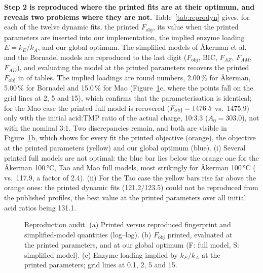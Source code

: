 \textbf{Step 2 is reproduced where the printed fits are at their optimum, and reveals two problems where they are not.} Table~\ref{tab:reprodyn} gives, for each of the twelve dynamic fits, the printed $F_\mathrm{obj}$, its value when the printed parameters are inserted into our implementation, the implied enzyme loading $E=k_E/k_A$, and our global optimum. The simplified models of Åkerman et al. and the Bornadel models are reproduced to the last digit ($F_\mathrm{obj}$, BIC, $F_{AZ}$, $F_{AM}$, $F_{AD}$), and evaluating the model at the printed parameters recovers the printed $F_\mathrm{obj}$ in \ReproConsistent{} of \ReproAll{} tables. The implied loadings are round numbers, 2.00\,\% for Åkerman, 5.00\,\% for Bornadel and 15.0\,\% for Mao (Figure~\ref{fig:repro}c, where the points fall on the grid lines at 2, 5 and 15), which confirms that the parameterisation is identical; for the Mao case the printed full model is recovered ($F_\mathrm{obj}=1476.5$ vs.\ 1475.9) only with the initial acid:TMP ratio of the actual charge, 10:3.3 ($A_0=303.0$), not with the nominal 3:1. Two discrepancies remain, and both are visible in Figure~\ref{fig:repro}b, which shows for every fit the printed objective (orange), the objective at the printed parameters (yellow) and our global optimum (blue). (i) Several printed full models are not optimal: the blue bar lies below the orange one for the Åkerman 100\,°C, Tao and Mao full models, most strikingly for Åkerman 100\,°C (\AkHundredFullGlobal{} vs.\ 117.9, a factor of 2.4). (ii) For the Tao case the yellow bars rise far above the orange ones: the printed dynamic fits (121.2/123.5) could not be reproduced from the published profiles, the best value at the printed parameters over all initial acid ratios being 131.1.
\begin{figure}[!htbp]\centering{}\caption{Reproduction audit. (a) Printed versus reproduced fingerprint and simplified-model quantities (log--log). (b) $F_\mathrm{obj}$ printed, evaluated at the printed parameters, and at our global optimum (F: full model, S: simplified model). (c) Enzyme loading implied by $k_E/k_A$ at the printed parameters; grid lines at 0.1, 2, 5 and 15.}\label{fig:repro}\end{figure}

